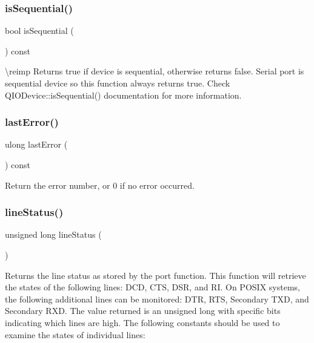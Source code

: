\subsubsection{\texorpdfstring{isSequential()}{isSequential()}}
{\footnotesize\ttfamily bool is\+Sequential (\begin{DoxyParamCaption}{ }\end{DoxyParamCaption}) const}

\textbackslash{}reimp Returns true if device is sequential, otherwise returns false. Serial port is sequential device so this function always returns true. Check Q\+I\+O\+Device\+::is\+Sequential() documentation for more information. \mbox{\label{class_qext_serial_port_a90581222a3c66b51c3a93e4e912a736b}} 
\subsubsection{\texorpdfstring{lastError()}{lastError()}}
{\footnotesize\ttfamily ulong last\+Error (\begin{DoxyParamCaption}{ }\end{DoxyParamCaption}) const}

Return the error number, or 0 if no error occurred. \mbox{\label{class_qext_serial_port_ab4ef88876c6435d0badc05cef9a4a34c}} 
\subsubsection{\texorpdfstring{lineStatus()}{lineStatus()}}
{\footnotesize\ttfamily unsigned long line\+Status (\begin{DoxyParamCaption}{ }\end{DoxyParamCaption})}

Returns the line status as stored by the port function. This function will retrieve the states of the following lines\+: D\+CD, C\+TS, D\+SR, and RI. On P\+O\+S\+IX systems, the following additional lines can be monitored\+: D\+TR, R\+TS, Secondary T\+XD, and Secondary R\+XD. The value returned is an unsigned long with specific bits indicating which lines are high. The following constants should be used to examine the states of individual lines\+:


